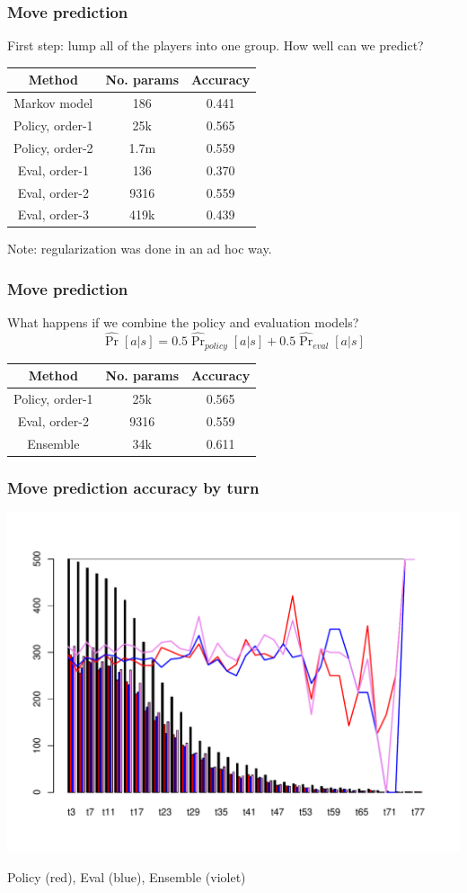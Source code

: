 \documentclass{beamer}
\begin{document}
\begin{frame}
\frametitle{Move prediction}
First step: lump all of the players into one group.  How well can we predict?
\begin{center}
\begin{tabular}{c|c|c}\hline
Method & No. params & Accuracy\\ \hline
Markov model & 186 & 0.441 \\\hline
Policy, order-1 & 25k & 0.565 \\ \hline
Policy, order-2 & 1.7m & 0.559 \\ \hline
Eval, order-1 & 136 & 0.370 \\ \hline
Eval, order-2 & 9316 & 0.559 \\ \hline
Eval, order-3 & 419k & 0.439 \\ \hline
\end{tabular}
\end{center}
Note: regularization was done in an ad hoc way.
\end{frame}

\begin{frame}
\frametitle{Move prediction}
What happens if we combine the policy and evaluation models?
\[
\hat{\Pr}[a|s] = 0.5 \hat{\Pr}_{policy}[a|s] + 0.5 \hat{\Pr}_{eval}[a|s]
\]
\begin{center}
\begin{tabular}{c|c|c}\hline
Method & No. params & Accuracy\\ \hline
Policy, order-1 & 25k & 0.565 \\ \hline
Eval, order-2 & 9316 & 0.559 \\ \hline
Ensemble & 34k & 0.611 \\ \hline
\end{tabular}
\end{center}
\end{frame}

\begin{frame}
\frametitle{Move prediction accuracy by turn}
\includegraphics[scale = 0.4]{acc_turn.pdf}

Policy (red), Eval (blue), Ensemble (violet)
\end{frame}
\end{document}
